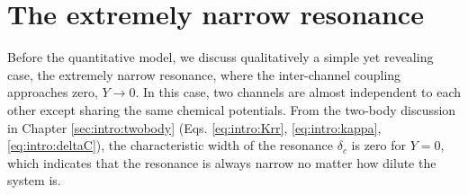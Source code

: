 \section{The extremely narrow resonance\label{sec:pathInt2:extremelyNR}}
Before the quantitative model, we discuss qualitatively a simple yet revealing case,   the extremely narrow resonance, where the inter-channel coupling approaches zero, $Y\rightarrow0$.  In this case, two channels are almost independent to each other except sharing the same chemical potentials.  From the two-body discussion in Chapter \ref{sec:intro:twobody} (Eqs. \ref{eq:intro:Krr}, \ref{eq:intro:kappa}, \ref{eq:intro:deltaC}), the characteristic width of the resonance $\delta_{c}$ is zero for $Y=0$, which indicates that the resonance is always narrow no matter how dilute the system is.  


